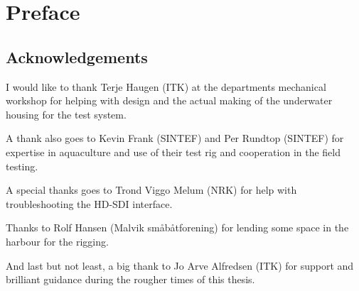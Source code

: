 
\chapter{Preface}


\section{Acknowledgements}

I would like to thank Terje Haugen (ITK) at the departments mechanical workshop for 
helping with design and the actual making of the underwater housing for the test system.

A thank also goes to Kevin Frank (SINTEF) and Per Rundtop (SINTEF) for expertise 
in aquaculture and use of their test rig and cooperation in the field testing. 

A special thanks goes to Trond Viggo Melum (NRK) for help with troubleshooting the HD-SDI interface.

Thanks to Rolf Hansen (Malvik småbåtforening) for lending some space in the harbour for the rigging.

And last but not least, a big thank to Jo Arve Alfredsen (ITK) for support and 
brilliant guidance during the rougher times of this thesis.
